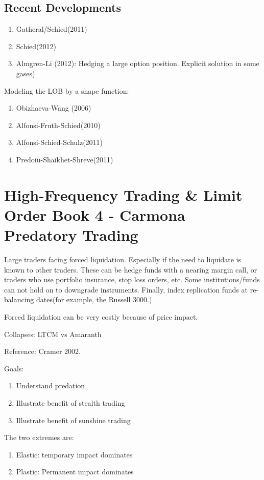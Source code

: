 \section{Recent Developments}
\begin{enumerate}
	\item Gatheral/Schied(2011)
	\item Schied(2012)
	\item Almgren-Li (2012): Hedging a large option position. Explicit solution in some gases)
\end{enumerate}
Modeling the LOB by a shape function:
\begin{enumerate}
	\item Obizhaeva-Wang (2006)
	\item Alfonsi-Fruth-Schied(2010)
	\item Alfonsi-Schied-Schulz(2011)
	\item Predoiu-Shaikhet-Shreve(2011)
\end{enumerate}

\chapter{High-Frequency Trading \& Limit Order Book 4 - Carmona\\Predatory Trading}
Large traders facing forced liquidation.
Especially if the need to liquidate is known to other traders. These can be hedge funds with a nearing margin call, or traders who use portfolio insurance, stop loss orders, etc. Some institutions/funds can not hold on to downgrade instruments. Finally, index replication funds at re-balancing dates(for example, the Russell 3000.)

Forced liquidation can be very costly because of price impact.

Collapses: LTCM vs Amaranth

Reference: Cramer 2002.

Goals:
\begin{enumerate}
	\item Understand predation
	\item Illustrate benefit of stealth trading
	\item Illustrate benefit of sunshine trading
\end{enumerate}

The two extremes are:
\begin{enumerate}
	\item Elastic: temporary impact dominates
	\item Plastic: Permanent impact dominates
\end{enumerate}


